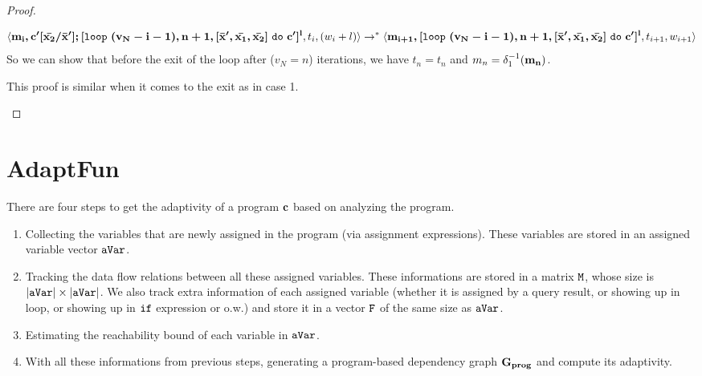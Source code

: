 \documentclass[a4paper,11pt]{article}
\newcommand{\THESYSTEM}{\textsf{AdaptFun}}
\begin{document}
\begin{proof}
\begin{itemize}
{\begin{enumerate}
\[{  }{
  \langle \boldsymbol{\mathbf{ {m_i}, c'[ \bar{x_2}/\bar{x}'  ];  [\mathtt{loop} ~ (v_N-i-1), n+1, [\bar{\boldsymbol{\mathbf{x}}}', \bar{\boldsymbol{\mathbf{x_1}}}, \bar{\boldsymbol{\mathbf{x_2}}}] ~  \mathtt{do} ~ c' ]^{l} }},  t_i, (w_i + l)   \rangle  \to^{*} \\ \langle  \boldsymbol{\mathbf{{m_{i+1}}, [\mathtt{loop} ~ (v_N-i-1), n+1, [\bar{\boldsymbol{\mathbf{x}}}', \bar{\boldsymbol{\mathbf{x_1}}}, \bar{\boldsymbol{\mathbf{x_2}}}] ~  \mathtt{do} ~ c' ]^{l}}}, t_{i+1}, w_{i+1}   \rangle 
  }
\]
So we can show that before the exit of the loop after ($v_N= n $) iterations, we have $t_{n} = t_{n}$ and $m_{n} = \delta_1^{-1}(\boldsymbol{\mathbf{m_{n}}})$.
 \end{enumerate}
%
This proof is similar when it comes to the exit as in case 1. 
}
\end{itemize}
%
\end{proof}
%
\clearpage
%
%
\section{\THESYSTEM}
There are four steps to get the adaptivity of a program $\boldsymbol{\mathbf{c}}$ based on analyzing the program. 
\begin{enumerate}
    \item Collecting the variables that are newly assigned in the program (via assignment expressions). These variables are stored in an assigned variable vector $\mathtt{aVar}$. 
    \item Tracking the data flow relations between all these assigned variables. These informations are stored in a matrix $\mathtt{M}$, whose size is $|\mathtt{aVar}| \times |\mathtt{aVar}|$. 
    We also track extra information of each assigned variable (whether it is assigned by a query result, or showing up in loop, or showing up in $\mathtt{if}$ expression or o.w.) and store it in a vector $\mathtt{F}$ of the same size as $\mathtt{aVar}$.
    \item Estimating the reachability bound of each variable in $\mathtt{aVar}$.
    \item With all these informations from previous steps, generating a program-based dependency graph $\mathtt{\bf{G_{prog}}}$ and compute its adaptivity.
\end{enumerate}
\end{document}
